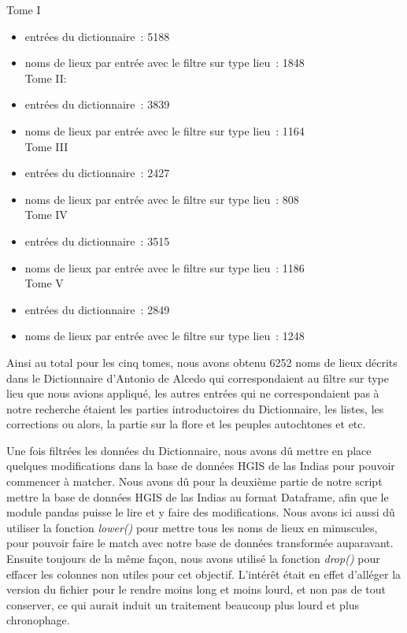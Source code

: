 \documentclass[a4paper,12pt,twoside]{book}
\begin{document}
 Tome I\\
\begin{itemize}
    \item entrées du dictionnaire : 5188
    \item noms de lieux par entrée avec le filtre sur type lieu : 1848\\

Tome II:\\
    \item entrées du dictionnaire : 3839
    \item noms de lieux par entrée avec le filtre sur type lieu : 1164\\

Tome III\\
    \item entrées du dictionnaire : 2427
    \item noms de lieux par entrée avec le filtre sur type lieu : 808\\

Tome IV\\
    \item entrées du dictionnaire : 3515
    \item noms de lieux par entrée avec le filtre sur type lieu : 1186\\

Tome V\\
    \item entrées du dictionnaire : 2849
    \item noms de lieux par entrée avec le filtre sur type lieu : 1248\\
\end{itemize}
Ainsi au total pour les cinq tomes, nous avons obtenu 6252 noms de lieux décrits dans le Dictionnaire d’Antonio de Alcedo qui correspondaient au filtre sur type lieu que nous avions appliqué, les autres entrées qui ne correspondaient pas à notre recherche étaient les parties introductoires du Dictionnaire, les listes, les corrections ou alors, la partie sur la flore et les peuples autochtones et etc.

Une fois filtrées les données du Dictionnaire, nous avons dû mettre en place quelques modifications dans la base de données HGIS de las Indias pour pouvoir commencer à matcher. Nous avons dû pour la deuxième partie de notre script mettre la base de données HGIS de las Indias au format Dataframe, afin que le module pandas puisse le lire et y faire des modifications. Nous avons ici aussi dû utiliser la fonction \textit{lower()} pour mettre tous les noms de lieux en minuscules, pour pouvoir faire le match avec notre base de données transformée auparavant. Ensuite toujours de la même façon, nous avons utilisé la fonction \textit{drop()} pour effacer les colonnes non utiles pour cet objectif. L’intérêt était en effet d’alléger la version du fichier pour le rendre moins long et moins lourd, et non pas de tout conserver, ce qui aurait induit un traitement beaucoup plus lourd et plus chronophage.
\end{document}
